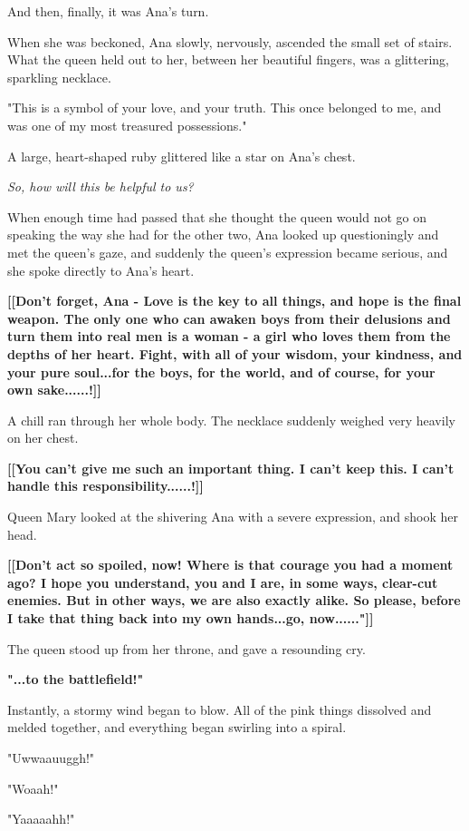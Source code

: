 \documentclass[
]{article}
\begin{document}
And then, finally, it was Ana's turn.

When she was beckoned, Ana slowly, nervously, ascended the small set of
stairs. What the queen held out to her, between her beautiful fingers,
was a glittering, sparkling necklace.

"This is a symbol of your love, and your truth. This once belonged to
me, and was one of my most treasured possessions."

A large, heart-shaped ruby glittered like a star on Ana's chest.

\emph{So, how will this be helpful to us?}

When enough time had passed that she thought the queen would not go on
speaking the way she had for the other two, Ana looked up questioningly
and met the queen's gaze, and suddenly the queen's expression became
serious, and she spoke directly to Ana's heart.

\textbf{{[}{[}Don't forget, Ana - Love is the key to all things, and
hope is the final weapon. The only one who can awaken boys from their
delusions and turn them into real men is a woman - a girl who loves them
from the depths of her heart. Fight, with all of your wisdom, your
kindness, and your pure soul...for the boys, for the world, and of
course, for your own sake......!{]}{]}}

A chill ran through her whole body. The necklace suddenly weighed very
heavily on her chest.

\textbf{{[}{[}You can't give me such an important thing. I can't keep
this. I can't handle this responsibility......!{]}{]}}

Queen Mary looked at the shivering Ana with a severe expression, and
shook her head.

\textbf{{[}{[}Don't act so spoiled, now! Where is that courage you had a
moment ago? I hope you understand, you and I are, in some ways,
clear-cut enemies. But in other ways, we are also exactly alike. So
please, before I take that thing back into my own hands...go,
now......"{]}{]}}

The queen stood up from her throne, and gave a resounding cry.

\textbf{"...to the battlefield!"}

Instantly, a stormy wind began to blow. All of the pink things dissolved
and melded together, and everything began swirling into a spiral.

"Uwwaauuggh!"

"Woaah!"

"Yaaaaahh!"
\end{document}
